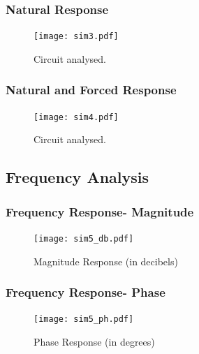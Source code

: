 \subsubsection{Natural Response}
\begin{figure}[ht] \centering
\texttt{[image: sim3.pdf]}
\caption{Circuit analysed.}
\label{fig:sim3}
\end{figure}



\subsubsection{Natural and Forced Response}

\begin{figure}[ht] \centering
\texttt{[image: sim4.pdf]}
\caption{Circuit analysed.}
\label{fig:sim4}
\end{figure}



\subsection{Frequency Analysis}

\subsubsection{Frequency Response- Magnitude}


\begin{figure}[ht] \centering
\texttt{[image: sim5\_db.pdf]}
\caption{Magnitude Response (in decibels)}
\label{fig:sim5_db}
\end{figure}

\subsubsection{Frequency Response- Phase}

\begin{figure}[ht] \centering
\texttt{[image: sim5\_ph.pdf]}
\caption{Phase Response (in degrees)}
\label{fig:sim5_ph}
\end{figure}






